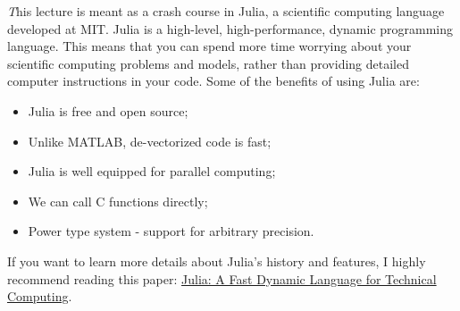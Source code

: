 \documentclass[11pt,a4paper,oneside]{report}
\begin{document}
{\it\huge T}his lecture is meant as a crash course in Julia, a scientific computing language developed at MIT. Julia is a high-level, high-performance, dynamic programming language. This means that you can spend more time worrying about your scientific computing problems and models, rather than providing detailed computer instructions in your code. Some of the benefits of using Julia are:\\
\begin{itemize}
\item Julia is free and open source;
\item Unlike MATLAB, de-vectorized code is fast;
\item Julia is well equipped for parallel computing;
\item We can call C functions directly;
\item Power type system - support for arbitrary precision.\\
\end{itemize}

If you want to learn more details about Julia's history and features, I highly recommend reading this paper: \href{http://julialang.org/images/julia-dynamic-2012-tr.pdf}{Julia: A Fast Dynamic Language for Technical Computing}.\\
\end{document}
